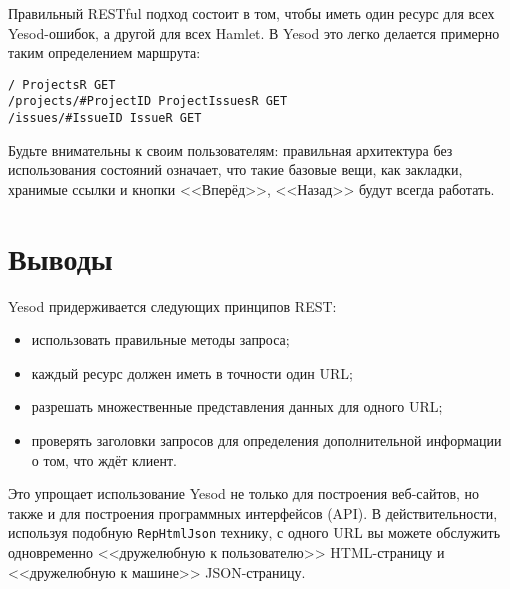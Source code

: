 Правильный RESTful подход состоит в том, чтобы иметь один ресурс для всех Yesod-ошибок,
а другой для всех Hamlet. В Yesod это легко делается примерно таким
определением маршрута:
\begin{lstlisting}
/ ProjectsR GET
/projects/#ProjectID ProjectIssuesR GET
/issues/#IssueID IssueR GET
\end{lstlisting}

Будьте внимательны к своим пользователям: правильная архитектура без использования состояний означает, что такие базовые вещи, как закладки, хранимые ссылки и кнопки <<Вперёд>>, <<Назад>> будут всегда работать.

\section{Выводы}

Yesod придерживается следующих принципов REST:
\begin{itemize}
 \item использовать правильные методы запроса;
 \item каждый ресурс должен иметь в точности один URL;
 \item разрешать множественные представления данных для одного URL;
 \item проверять заголовки запросов для определения дополнительной информации о том, что
ждёт клиент.
\end{itemize}

Это упрощает использование Yesod не только для построения веб-сайтов, но также и для
построения программных интерфейсов (API). В действительности, используя подобную
\verb*|RepHtmlJson| технику, с одного URL вы можете обслужить одновременно <<дружелюбную к
пользователю>> HTML-страницу и <<дружелюбную к машине>> JSON-страницу.
